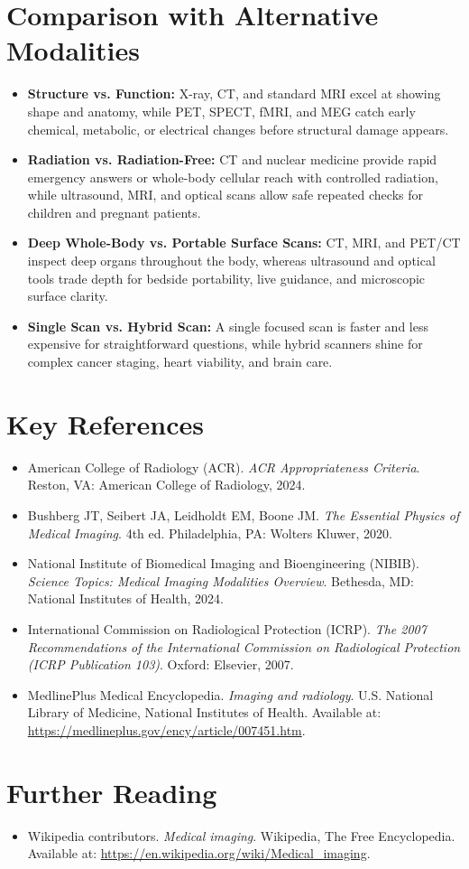 \section{Comparison with Alternative Modalities}
\begin{itemize}
  \item \textbf{Structure vs. Function:} X-ray, CT, and standard MRI excel at showing shape and anatomy, while PET, SPECT, fMRI, and MEG catch early chemical, metabolic, or electrical changes before structural damage appears.
  \item \textbf{Radiation vs. Radiation-Free:} CT and nuclear medicine provide rapid emergency answers or whole-body cellular reach with controlled radiation, while ultrasound, MRI, and optical scans allow safe repeated checks for children and pregnant patients.
  \item \textbf{Deep Whole-Body vs. Portable Surface Scans:} CT, MRI, and PET/CT inspect deep organs throughout the body, whereas ultrasound and optical tools trade depth for bedside portability, live guidance, and microscopic surface clarity.
  \item \textbf{Single Scan vs. Hybrid Scan:} A single focused scan is faster and less expensive for straightforward questions, while hybrid scanners shine for complex cancer staging, heart viability, and brain care.
\end{itemize}

\section{Key References}
\begin{itemize}
  \item American College of Radiology (ACR). \textit{ACR Appropriateness Criteria}. Reston, VA: American College of Radiology, 2024.
  \item Bushberg JT, Seibert JA, Leidholdt EM, Boone JM. \textit{The Essential Physics of Medical Imaging}. 4th ed. Philadelphia, PA: Wolters Kluwer, 2020.
  \item National Institute of Biomedical Imaging and Bioengineering (NIBIB). \textit{Science Topics: Medical Imaging Modalities Overview}. Bethesda, MD: National Institutes of Health, 2024.
  \item International Commission on Radiological Protection (ICRP). \textit{The 2007 Recommendations of the International Commission on Radiological Protection (ICRP Publication 103)}. Oxford: Elsevier, 2007.
  \item MedlinePlus Medical Encyclopedia. \textit{Imaging and radiology}. U.S. National Library of Medicine, National Institutes of Health. Available at: \url{https://medlineplus.gov/ency/article/007451.htm}.
\end{itemize}

\section{Further Reading}
\begin{itemize}
  \item Wikipedia contributors. \textit{Medical imaging}. Wikipedia, The Free Encyclopedia. Available at: \url{https://en.wikipedia.org/wiki/Medical_imaging}.
\end{itemize}
